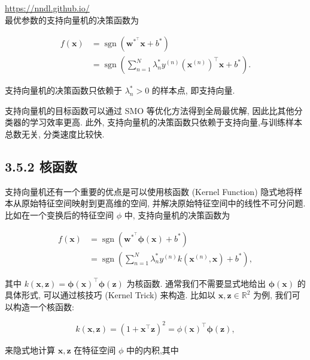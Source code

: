\documentclass[10pt]{article}
\begin{document}
\href{https://nndl.github.io/}{https://nndl.github.io/}\\
最优参数的支持向量机的决策函数为


\begin{align*}
f(\boldsymbol{x}) & =\operatorname{sgn}\left(\boldsymbol{w}^{*^{\top}} \boldsymbol{x}+b^{*}\right)  \tag{3.93}\\
& =\operatorname{sgn}\left(\sum_{n=1}^{N} \lambda_{n}^{*} y^{(n)}\left(\boldsymbol{x}^{(n)}\right)^{\top} \boldsymbol{x}+b^{*}\right) . \tag{3.94}
\end{align*}


支持向量机的决策函数只依赖于 $\lambda_{n}^{*}>0$ 的样本点, 即支持向量.

支持向量机的目标函数可以通过 SMO 等优化方法得到全局最优解, 因此比其他分类器的学习效率更高. 此外, 支持向量机的决策函数只依赖于支持向量,与训练样本总数无关, 分类速度比较快.

\subsection*{3.5.2 核函数}
支持向量机还有一个重要的优点是可以使用核函数 (Kernel Function) 隐式地将样本从原始特征空间映射到更高维的空间, 并解决原始特征空间中的线性不可分问题. 比如在一个变换后的特征空间 $\phi$ 中, 支持向量机的决策函数为


\begin{align*}
f(\boldsymbol{x}) & =\operatorname{sgn}\left(\boldsymbol{w}^{*^{\top}} \boldsymbol{\phi}(\boldsymbol{x})+b^{*}\right)  \tag{3.95}\\
& =\operatorname{sgn}\left(\sum_{n=1}^{N} \lambda_{n}^{*} y^{(n)} k\left(\boldsymbol{x}^{(n)}, \boldsymbol{x}\right)+b^{*}\right), \tag{3.96}
\end{align*}


其中 $k(\boldsymbol{x}, \boldsymbol{z})=\boldsymbol{\phi}(\boldsymbol{x})^{\top} \boldsymbol{\phi}(\boldsymbol{z})$ 为核函数. 通常我们不需要显式地给出 $\boldsymbol{\phi}(\boldsymbol{x})$ 的具体形式, 可以通过核技巧 (Kernel Trick) 来构造. 比如以 $\boldsymbol{x}, \boldsymbol{z} \in \mathbb{R}^{2}$ 为例, 我们可以构造一个核函数:


\begin{equation*}
k(\boldsymbol{x}, \boldsymbol{z})=\left(1+\boldsymbol{x}^{\top} \boldsymbol{z}\right)^{2}=\phi(\boldsymbol{x})^{\top} \boldsymbol{\phi}(\boldsymbol{z}), \tag{3.97}
\end{equation*}


来隐式地计算 $\boldsymbol{x}, \boldsymbol{z}$ 在特征空间 $\phi$ 中的内积,其中
\end{document}
